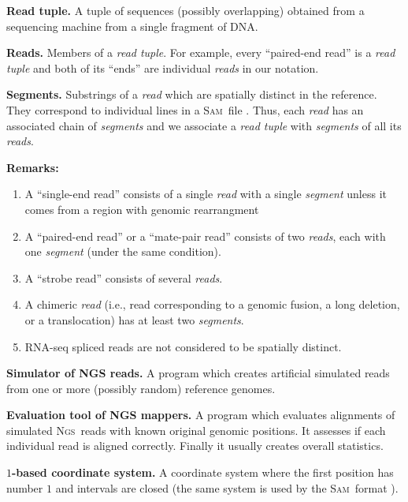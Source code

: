 \documentclass[10pt,a4paper]{article}
\newcommand{\SAM}{\textsc{Sam}}
\newcommand{\NGS}{\textsc{Ngs}}
\begin{document}
\begin{description}
	\item \textbf{Read tuple.} 
	A tuple of sequences (possibly overlapping) obtained from a sequencing machine from a single fragment of DNA.

	\item \textbf{Reads.} 
	Members of a {\em read tuple}. For example, every ``paired-end read'' is a {\em read tuple} and both of its ``ends'' are individual {\em reads} in our notation.

	\item \textbf{Segments.}
	Substrings of a {\em read} which are spatially distinct in the reference.
	They correspond to individual lines in a \SAM\ file \cite{samtools}. Thus, each {\em read} has an
	associated chain of {\em segments} and we associate
	a {\em read tuple} with {\em segments} of all its {\em reads}.
		
	\textbf{Remarks:}
	\begin{enumerate}[-]
		\item A ``single-end read'' consists of a single {\em read} with a single {\em segment}
		unless it comes from a region with genomic rearrangment
		\item A ``paired-end read'' or a ``mate-pair read'' consists
		of two {\em reads}, each with one {\em segment} (under the same condition).
		\item A ``strobe read'' consists of several {\em reads}.
		\item A chimeric {\em read} (i.e., read corresponding to a genomic fusion, a long deletion, or a translocation) has at least two {\em segments}.
		\item RNA-seq spliced reads are not considered to be spatially distinct.
	\end{enumerate}

	

	\item \textbf{Simulator of NGS reads.}
	A program which creates artificial simulated reads from one
	or more (possibly random) reference genomes.
	
		
	\item \textbf{Evaluation tool of NGS mappers.} 
	A program which evaluates alignments of simulated \NGS\ reads with known original
	genomic positions. It assesses if each individual read is aligned correctly. 	Finally it usually creates overall statistics.

	\item \textbf{$1$-based coordinate system.}
	A coordinate system where the first position has number $1$
	and intervals are closed (the same system is used by the \SAM\ format \cite{samtools}).
\end{description}
\end{document}
